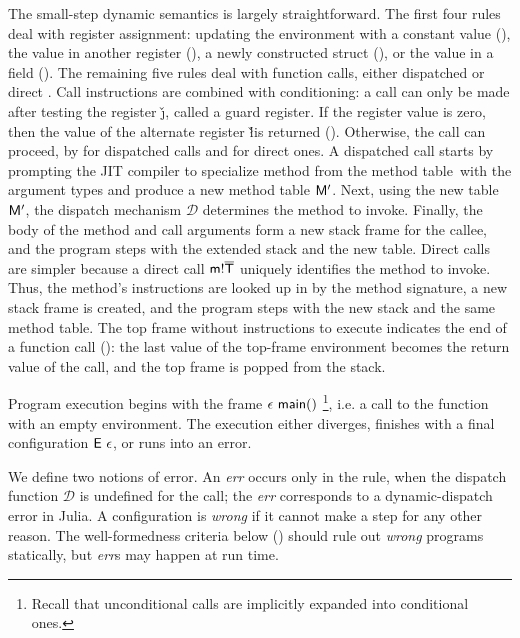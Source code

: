 The small-step dynamic semantics is largely straightforward. The first four
rules deal with register assignment: updating the environment with a constant
value (), the value in another register (),
a newly constructed struct (), or the value in a field ().
The remaining five rules deal with function calls, either dispatched
\call\m{\ol{\v\k}} or direct \direct\m{\ol\Ty}{\ol{\v\k}}.
Call instructions are combined with conditioning: a call can only be made after
testing the register \v\j, called a guard register.
If the register value is zero, then the value of the alternate register
\v\l is returned ().
Otherwise, the call can proceed, by  for dispatched calls and 
for direct ones.
%
A dispatched call starts by prompting the JIT compiler to
specialize method \m from the method table~\mtbl with the argument types \ol\Ty
and produce a new method table $\mathsf{M}'$.
Next, using the new table $\mathsf{M}'$, the dispatch mechanism $\mathcal D$
determines the method to invoke. Finally, the body  of the method and
call arguments \idx{} form a new stack frame for the callee,
and the program steps with the extended stack and the new table.
%
Direct calls are simpler because
a direct call $\mathsf{m}!{\overline{\mathsf{T}}}$ uniquely identifies the
method to invoke. Thus, the method's instructions are looked up in \mtbl
by the method signature, a new stack frame is created,
and the program steps with the new stack and the same method table.
%
The top frame without instructions to execute indicates the
end of a function call (): the last value of the top-frame environment
becomes the return value of the call, and the top frame is popped from the stack.

Program execution begins with the frame $\epsilon\ \mathsf{main}()$%
\footnote{Recall that unconditional calls are implicitly expanded into conditional ones.},
i.e. a call to the \main function with an empty environment.
The execution either diverges, finishes with a final configuration $\mathsf{E}\ \epsilon$,
or runs into an error.

We define two notions of error. An \emph{err} occurs only in the  rule,
when the dispatch function $\mathcal D$ is undefined for the call; the \emph{err}
corresponds to a dynamic-dispatch error in Julia. A configuration is
\emph{wrong} if it cannot make a step for any other reason. The well-formedness
criteria below () should rule out \emph{wrong} programs statically, but
\emph{err}s may happen at run time.

